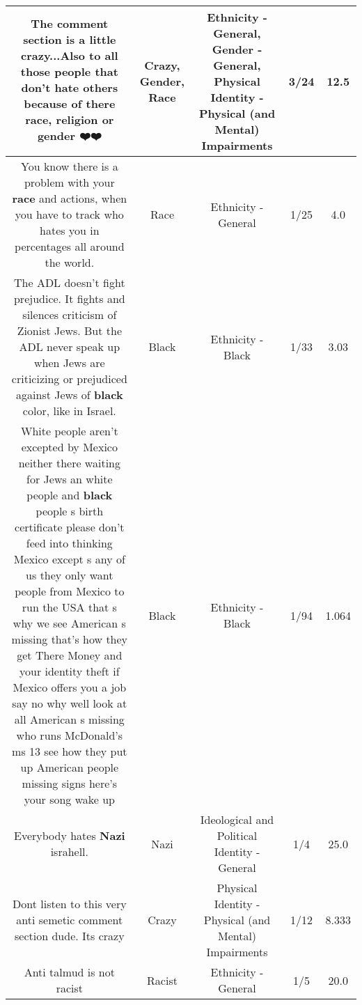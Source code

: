 \documentclass[11pt]{article}
\newlength\mylength
\begin{document}
\begin{center}
\begin{longtable}{|C{.65\mylength}|C{.30\mylength}|C{.12\mylength}|C{.12\mylength}|C{.12\mylength}|}
  \small The comment section is a little \textbf{crazy}...Also to all those people that don't hate others because of there \textbf{race}, religion or \textbf{gender} ❤️❤️\normalsize   & Crazy, Gender, Race & Ethnicity - General, Gender - General, Physical Identity - Physical (and Mental) Impairments & 3/24 & 12.5 \\  \hline
  \small You know there is a problem with your \textbf{race} and actions, when you have to track who hates you in percentages all around the world.\normalsize   & Race & Ethnicity - General & 1/25 & 4.0 \\  \hline
  \small The ADL doesn't fight prejudice.  It fights and silences criticism of Zionist Jews. But the ADL never speak up when Jews are criticizing or prejudiced against Jews of \textbf{black} color, like in Israel.\normalsize   & Black & Ethnicity - Black & 1/33 & 3.03 \\  \hline
  \small White people aren't excepted by Mexico neither there waiting for Jews an white people and \textbf{black} people s birth certificate please don't feed into thinking Mexico except s any of us they only want people from Mexico to run the USA that s why we see American s missing that's how they get There Money and your identity theft if Mexico offers you a job say no why well look at all American s missing who runs McDonald's ms 13 see how they put up American people missing signs here's your song wake up\normalsize   & Black & Ethnicity - Black & 1/94 & 1.064 \\  \hline
  \small Everybody hates \textbf{Nazi} israhell.\normalsize   & Nazi &  Ideological and Political Identity - General & 1/4 & 25.0 \\  \hline
  \small Dont listen to this very anti semetic comment section dude. Its crazy\normalsize   & Crazy & Physical Identity - Physical (and Mental) Impairments & 1/12 & 8.333 \\  \hline
  \small Anti talmud is not racist\normalsize   & Racist & Ethnicity - General & 1/5 & 20.0 \\  \hline

\end{longtable}
\end{center}
\end{document}
